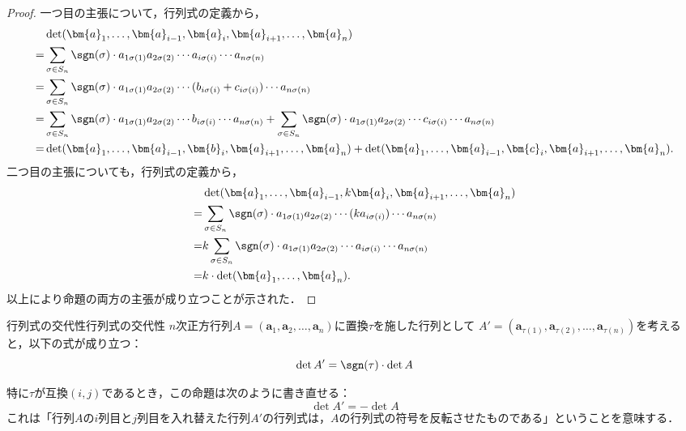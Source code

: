 \begin{leftbar}
\begin{proof}
  一つ目の主張について，行列式の定義から，
  \begin{align*} 
    &\det(\bm{a}_1, \dots, \bm{a}_{i-1}, \bm{a}_i, \bm{a}_{i+1}, \dots, \bm{a}_n) \\
    =& \sum_{\sigma \in S_n} \sgn(\sigma) \cdot a_{1\sigma(1)} a_{2\sigma(2)} \dotsm a_{i\sigma(i)} \dotsm a_{n\sigma(n)} \\
    =& \sum_{\sigma \in S_n} \sgn(\sigma) \cdot a_{1\sigma(1)} a_{2\sigma(2)} \dotsm (b_{i\sigma(i)} + c_{i\sigma(i)}) \dotsm a_{n\sigma(n)} \\
    =& \sum_{\sigma \in S_n} \sgn(\sigma) \cdot a_{1\sigma(1)} a_{2\sigma(2)} \dotsm b_{i\sigma(i)} \dotsm a_{n\sigma(n)} 
    + \sum_{\sigma \in S_n} \sgn(\sigma) \cdot a_{1\sigma(1)} a_{2\sigma(2)} \dotsm c_{i\sigma(i)} \dotsm a_{n\sigma(n)} \\
    =& \det(\bm{a}_1, \dots, \bm{a}_{i-1}, \bm{b}_i, \bm{a}_{i+1}, \dots, \bm{a}_n) 
     + \det(\bm{a}_1, \dots, \bm{a}_{i-1}, \bm{c}_i, \bm{a}_{i+1}, \dots, \bm{a}_n).
  \end{align*}
  二つ目の主張についても，行列式の定義から，
  \begin{align*} 
    &\det(\bm{a}_1, \dots, \bm{a}_{i-1}, k \bm{a}_i, \bm{a}_{i+1}, \dots, \bm{a}_n) \\
    =& \sum_{\sigma \in S_n} \sgn(\sigma) \cdot a_{1\sigma(1)} a_{2\sigma(2)} \dotsm (k a_{i\sigma(i)}) \dotsm a_{n\sigma(n)} \\
    =& k \sum_{\sigma \in S_n} \sgn(\sigma) \cdot a_{1\sigma(1)} a_{2\sigma(2)} \dotsm a_{i\sigma(i)} \dotsm a_{n\sigma(n)} \\
    =& k \cdot \det(\bm{a}_1, \dots, \bm{a}_n).
  \end{align*}
  以上により命題の両方の主張が成り立つことが示された．
\end{proof}
\end{leftbar}

\begin{prop}{行列式の交代性}{行列式の交代性}
  $n$次正方行列$A = (\bm{a}_1, \bm{a}_2, \dots, \bm{a}_n)$に置換$\tau$を施した行列として
  $A' = (\bm{a}_{\tau(1)}, \bm{a}_{\tau(2)}, \dots, \bm{a}_{\tau(n)})$を考えると，以下の式が成り立つ：
  \[
  \det A ' = \sgn (\tau) \cdot \det A
  \]
\end{prop}
特に$\tau$が互換$(i,j)$であるとき，この命題は次のように書き直せる：
\[
\det A'  = -\det A
\]
これは「行列$A$の$i$列目と$j$列目を入れ替えた行列$A'$の行列式は，$A$の行列式の符号を反転させたものである」ということを意味する．

